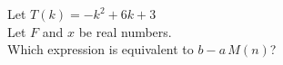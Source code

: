\documentclass{ximera}
\begin{document}
\begin{exercise}
\begin{question}
\end{question}








\begin{question}
Let $T(k) = -k^2 + 6k + 3$ \\

Let $F$ and $x$ be real numbers. \\

Which expression is equivalent to $b - a \, M(n)$?


\begin{multipleChoice}
\end{multipleChoice}

\end{question}







\end{exercise}
\end{document}
